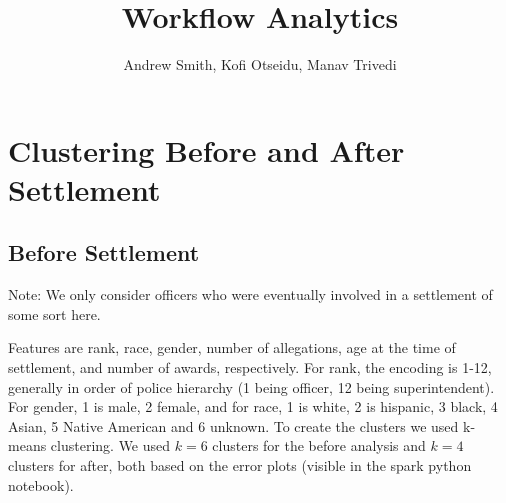 \documentclass{article}
\title{Workflow Analytics}
\author{Andrew Smith, Kofi Otseidu, Manav Trivedi}
\begin{document}
\maketitle

\section{Clustering Before and After Settlement}
\subsection{Before Settlement}
Note: We only consider officers who were eventually involved in a settlement of some sort here.

Features are rank, race, gender, number of allegations, age at the time of settlement, and number of awards, respectively. For rank, the encoding is 1-12, generally in order of police hierarchy (1 being officer, 12 being superintendent). For gender, 1 is male, 2 female, and for race, 1 is white, 2 is hispanic, 3 black, 4 Asian, 5 Native American and 6 unknown. To create the clusters we used k-means clustering. We used $k=6$ clusters for the before analysis and $k=4$ clusters for after, both based on the error plots (visible in the spark python notebook).
\end{document}

